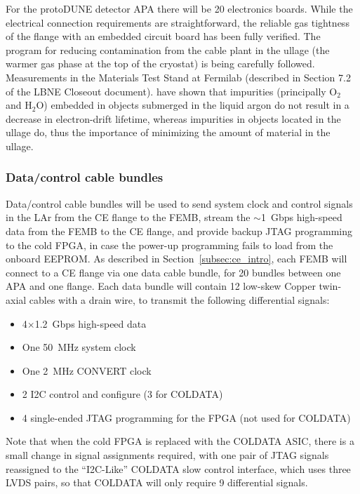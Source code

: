 For the protoDUNE detector APA there will be 20 electronics boards.
While the electrical connection requirements are straightforward,
the reliable gas tightness of the flange with an embedded circuit board has been fully verified.
The program for reducing contamination from the cable plant in the ullage
(the warmer gas phase at the top of the cryostat) 
is being carefully followed.
Measurements in the Materials Test Stand at Fermilab (described in Section 7.2 of the LBNE Closeout document).
have shown that impurities (principally O$_2$ and H$_2$O) embedded in objects submerged in the liquid argon do not result
in a decrease in electron-drift lifetime, whereas impurities in objects located in the ullage do, thus
the importance of minimizing the amount of material in the ullage.

%
\subsubsection{Data/control cable bundles}
\label{subsubsec:ce_data_cable}


Data/control cable bundles will be used to send system clock and control signals in the LAr from the 
CE flange to the FEMB, stream the $\sim$1~Gbps high-speed data from the FEMB to the CE flange, and 
provide backup JTAG programming to the cold FPGA, in case the power-up programming fails to 
load from the onboard EEPROM. As described in Section~\ref{subsec:ce_intro}, each FEMB will 
connect to a CE flange via one data cable bundle, for 20 bundles between one APA and one flange.
Each data bundle will contain 12 low-skew Copper twin-axial cables with a drain wire, 
to transmit the following differential signals:

\begin{itemize}
    \item 4$\times$1.2~Gbps high-speed data
    \item One 50~MHz system clock
    \item One 2~MHz CONVERT clock
    \item 2 I2C control and configure (3 for COLDATA)
    \item 4 single-ended JTAG programming for the FPGA (not used for COLDATA)
\end{itemize}

Note that when the cold FPGA is replaced with the COLDATA ASIC, there
is a small change in signal assignments required, with one pair of
JTAG signals reassigned to the ``I2C-Like'' COLDATA slow control
interface, which uses three LVDS pairs, so that COLDATA will only
require 9 differential signals.

